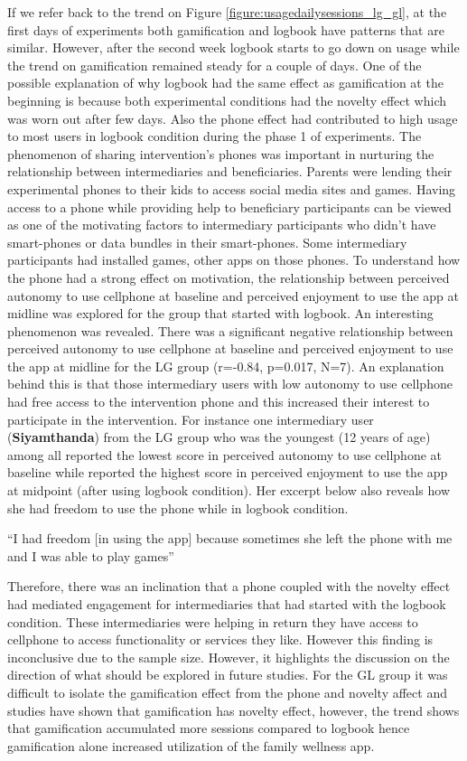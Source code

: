If we refer back to the trend on Figure \ref{figure:usagedailysessions_lg_gl}, at the first days of experiments both gamification and logbook have patterns that are similar. However, after the second week logbook starts to go down on usage while the trend on gamification remained steady for a couple of days. One of the possible explanation of why logbook had the same effect as gamification at the beginning is because both experimental conditions had the novelty effect which was worn out after few days. Also the phone effect had contributed to high usage to most users in logbook condition during the phase 1 of experiments. The phenomenon of sharing intervention's phones was important in nurturing the relationship between intermediaries and beneficiaries. Parents were lending their experimental phones to their kids to access social media sites and games. Having access to a phone while providing help to beneficiary participants can be viewed as one of the motivating factors to intermediary participants who didn't have smart-phones or data bundles in their smart-phones. Some intermediary participants had installed games, other apps on those phones. To understand how the phone had a strong effect on motivation, the relationship between perceived autonomy to use cellphone at baseline and perceived enjoyment to use the app at midline was explored for the group that started with logbook. An interesting phenomenon was revealed. There was a significant negative relationship between perceived autonomy to use cellphone at baseline and perceived enjoyment to use the app at midline for the LG group (r=-0.84, p=0.017, N=7). An explanation behind this is that those intermediary users with low autonomy to use cellphone had free access to the intervention  phone and this increased their interest to participate in the intervention. For instance one intermediary user (\textbf{Siyamthanda}) from the LG group who was the youngest (12 years of age) among all reported the lowest score in perceived autonomy to use cellphone at baseline while reported the highest score in  perceived enjoyment to use the app at midpoint (after using logbook condition). Her excerpt below also reveals how she had freedom to use the phone while in logbook condition. 

 {``I had freedom [in using the app] because sometimes she left the phone with me and I was able to play games''}

Therefore, there was an inclination that a phone coupled with the novelty effect had mediated engagement for intermediaries that had started with the logbook condition. These intermediaries were helping in return they have access to cellphone to access functionality or services they like. However this finding is inconclusive due to the sample size. However, it highlights the discussion on the direction of what should be explored in future studies. For the GL group it was difficult to isolate the gamification effect from the phone and novelty affect and studies have shown that gamification has novelty effect, however, the trend shows that gamification accumulated more sessions compared to logbook hence gamification alone increased utilization of the family wellness app.

